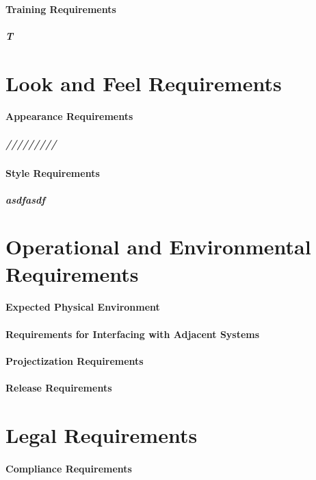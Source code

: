 \documentclass{article}
\begin{document}
\paragraph{Training Requirements}

\subparagraph{T}

\newpage
\section{Look and Feel Requirements}

\paragraph{Appearance Requirements}
\subparagraph{/////////}
\paragraph{Style Requirements}
\subparagraph{ asdfasdf}


\newpage
\section{Operational and Environmental Requirements}


\paragraph{Expected Physical Environment}
\paragraph{Requirements for Interfacing with Adjacent Systems}
\paragraph{Projectization Requirements}
\paragraph{Release Requirements}

\newpage


\section{Legal Requirements}



\paragraph{Compliance Requirements}
\end{document}
